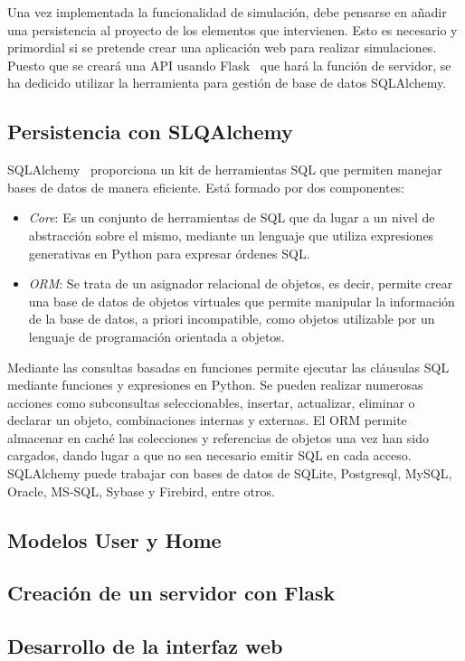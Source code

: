 Una vez implementada la funcionalidad de simulación, debe pensarse en añadir una persistencia al proyecto de los elementos que intervienen. Esto es necesario y primordial si se pretende crear una aplicación web para realizar simulaciones. Puesto que se creará una API usando Flask~\cite{Flask} que hará la función de servidor, se ha dedicido utilizar la herramienta para gestión de base de datos SQLAlchemy.
\subsection{Persistencia con SLQAlchemy}
SQLAlchemy~\cite{SqlAl} proporciona un kit de herramientas SQL que permiten manejar bases de datos de manera eficiente. Está formado por dos componentes:
\begin{itemize}
\item \textit{Core}: Es un conjunto de herramientas de SQL que da lugar a un nivel de abstracción sobre el mismo, mediante un lenguaje que utiliza expresiones generativas en Python para expresar órdenes SQL.
\item \textit{ORM}: Se trata de un asignador relacional de objetos, es decir, permite crear una base de datos de objetos virtuales que permite manipular la información de la base de datos, a priori incompatible, como objetos utilizable por un lenguaje de programación orientada a objetos.
\end{itemize}
Mediante las consultas basadas en funciones permite ejecutar las cláusulas SQL mediante funciones y expresiones en Python. Se pueden realizar numerosas acciones como subconsultas seleccionables, insertar, actualizar, eliminar o declarar un objeto, combinaciones internas y externas. El ORM permite almacenar en caché las colecciones y referencias de objetos una vez han sido cargados, dando lugar a que no sea necesario emitir SQL en cada acceso.\\

SQLAlchemy puede trabajar con bases de datos de SQLite, Postgresql, MySQL, Oracle, MS-SQL, Sybase y Firebird, entre otros.
\subsection{Modelos User y Home}
\subsection{Creación de un servidor con Flask}
\subsection{Desarrollo de la interfaz web}
